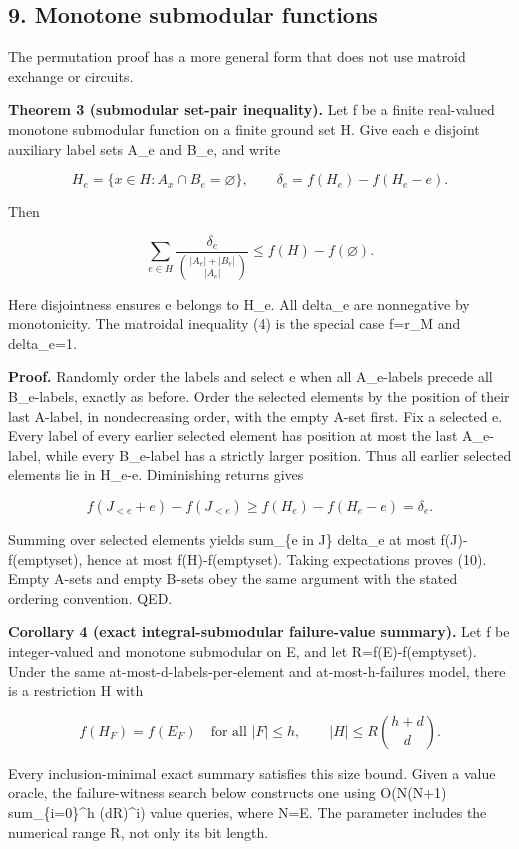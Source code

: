 \hypertarget{af-4c0863a692-monotone-submodular-functions}{%
\subsection{9. Monotone submodular functions}\label{af-4c0863a692-monotone-submodular-functions}}

The permutation proof has a more general form that does not use matroid exchange or circuits.

\textbf{Theorem 3 (submodular set-pair inequality).} Let f be a finite real-valued monotone submodular function on a finite ground set H. Give each e disjoint auxiliary label sets A\_e and B\_e, and write

\[
H_e=\{x\in H:A_x\cap B_e=\varnothing\},
\qquad
\delta_e=f(H_e)-f(H_e-e).
\]

Then

\[
\boxed{
\sum_{e\in H}
\frac{\delta_e}{\binom{|A_e|+|B_e|}{|A_e|}}
\le f(H)-f(\varnothing).
} \tag{10}
\]

Here disjointness ensures e belongs to H\_e. All delta\_e are nonnegative by monotonicity. The matroidal inequality (4) is the special case f=r\_M and delta\_e=1.

\textbf{Proof.} Randomly order the labels and select e when all A\_e-labels precede all B\_e-labels, exactly as before. Order the selected elements by the position of their last A-label, in nondecreasing order, with the empty A-set first. Fix a selected e. Every label of every earlier selected element has position at most the last A\_e-label, while every B\_e-label has a strictly larger position. Thus all earlier selected elements lie in H\_e-e. Diminishing returns gives

\[
f(J_{<e}+e)-f(J_{<e})\ge f(H_e)-f(H_e-e)=\delta_e.
\]

Summing over selected elements yields sum\_\{e in J\} delta\_e at most f(J)-f(emptyset), hence at most f(H)-f(emptyset). Taking expectations proves (10). Empty A-sets and empty B-sets obey the same argument with the stated ordering convention. QED.

\textbf{Corollary 4 (exact integral-submodular failure-value summary).} Let f be integer-valued and monotone submodular on E, and let R=f(E)-f(emptyset). Under the same at-most-d-labels-per-element and at-most-h-failures model, there is a restriction H with

\[
f(H_F)=f(E_F)\quad\text{for all }|F|\le h,
\qquad
|H|\le R\binom{h+d}{d}. \tag{11}
\]

Every inclusion-minimal exact summary satisfies this size bound. Given a value oracle, the failure-witness search below constructs one using O(N(N+1) sum\_\{i=0\}\^{}h (dR)\^{}i) value queries, where N=\textbar E\textbar. The parameter includes the numerical range R, not only its bit length.

